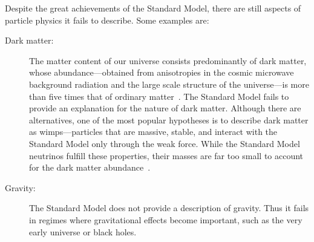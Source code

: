 Despite the great achievements of the Standard Model, there are still aspects of particle physics it fails to describe. Some examples are:
\begin{description}
    \item[Dark matter:] The matter content of our universe consists predominantly of dark matter, whose abundance---obtained from anisotropies in the cosmic microwave background radiation and the large scale structure of the universe---is more than five times that of ordinary matter~\cite{Planck:2018vyg}.
    The Standard Model fails to provide an explanation for the nature of dark matter.
    Although there are alternatives, one of the most popular hypotheses is to describe dark matter as \glspl{wimp}---particles that are massive, stable, and interact with the Standard Model only through the weak force.
    While the Standard Model neutrinos fulfill these properties, their masses are far too small to account for the dark matter abundance~\cite{Sokolenko:2019ngf}.
    
    \item[Gravity:] The Standard Model does not provide a description of gravity. Thus it fails in regimes where gravitational effects become important, such as the very early universe or black holes.
    

\end{description}

